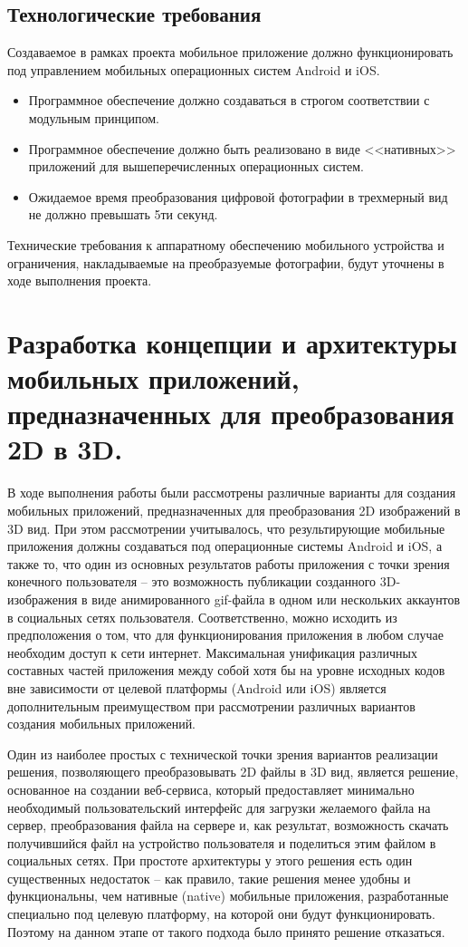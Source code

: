 \subsection{Технологические требования}

Создаваемое в рамках проекта мобильное приложение должно функционировать под управлением мобильных операционных систем Android и iOS.

\begin{itemize}
	\item Программное обеспечение должно создаваться в строгом соответствии с модульным принципом.
	\item Программное обеспечение должно быть реализовано в виде <<нативных>> приложений для вышеперечисленных операционных систем.
	\item Ожидаемое время преобразования цифровой фотографии в трехмерный вид не должно превышать 5ти секунд. 
\end{itemize}

Технические требования к аппаратному обеспечению мобильного устройства и ограничения, накладываемые на преобразуемые фотографии, будут уточнены в ходе выполнения проекта.

\section{Разработка концепции и архитектуры мобильных приложений, предназначенных для преобразования 2D в 3D.}
В ходе выполнения работы были рассмотрены различные варианты для создания мобильных приложений, предназначенных для преобразования 2D изображений в 3D вид. При этом рассмотрении учитывалось, что результирующие мобильные приложения должны создаваться под операционные системы Android и iOS, а также то, что один из основных результатов работы приложения с точки зрения конечного пользователя – это возможность публикации созданного 3D-изображения в виде анимированного gif-файла в одном или нескольких аккаунтов в социальных сетях пользователя. Соответственно, можно исходить из предположения о том, что для функционирования приложения в любом случае необходим доступ к сети интернет. Максимальная унификация различных составных частей приложения между собой хотя бы на уровне исходных кодов вне зависимости от целевой платформы (Android или iOS) является дополнительным преимуществом при рассмотрении различных вариантов создания мобильных приложений.

Один из наиболее простых с технической точки зрения вариантов реализации решения, позволяющего преобразовывать 2D файлы в 3D вид, является решение, основанное на создании веб-сервиса, который предоставляет минимально необходимый пользовательский интерфейс для загрузки желаемого файла на сервер, преобразования файла на сервере и, как результат, возможность скачать получившийся файл на устройство пользователя и поделиться этим файлом в социальных сетях. При простоте архитектуры у этого решения есть один существенных недостаток – как правило, такие решения менее удобны и функциональны, чем нативные (native) мобильные приложения, разработанные специально под целевую платформу, на которой они будут функционировать. Поэтому на данном этапе от такого подхода было принято решение отказаться.

